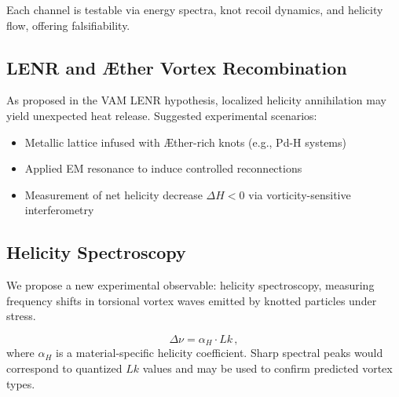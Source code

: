 Each channel is testable via energy spectra, knot recoil dynamics, and helicity flow, offering falsifiability.

\subsection{LENR and Æther Vortex Recombination}

As proposed in the VAM LENR hypothesis, localized helicity annihilation may yield unexpected heat release. Suggested experimental scenarios:
\begin{itemize}
    \item Metallic lattice infused with Æther-rich knots (e.g., Pd-H systems)
    \item Applied EM resonance to induce controlled reconnections
    \item Measurement of net helicity decrease $\Delta H < 0$ via vorticity-sensitive interferometry
\end{itemize}

\subsection{Helicity Spectroscopy}

We propose a new experimental observable: helicity spectroscopy, measuring frequency shifts in torsional vortex waves emitted by knotted particles under stress.

\begin{equation}
    \Delta \nu = \alpha_H \cdot Lk \, ,
\end{equation}
where $\alpha_H$ is a material-specific helicity coefficient. Sharp spectral peaks would correspond to quantized $Lk$ values and may be used to confirm predicted vortex types.